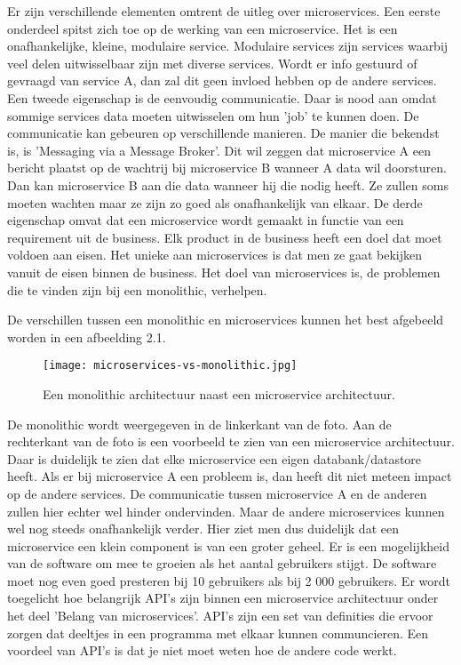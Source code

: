 Er zijn verschillende elementen omtrent de uitleg over microservices. Een eerste onderdeel spitst zich toe op de  werking van een microservice. Het is een onafhankelijke, kleine, modulaire service. Modulaire services zijn services waarbij veel delen uitwisselbaar zijn met diverse services. Wordt er info gestuurd of gevraagd van service A, dan zal dit geen invloed hebben op de andere services. Een tweede eigenschap is de eenvoudig communicatie. Daar is nood aan omdat sommige services data moeten uitwisselen om hun 'job' te kunnen doen. De communicatie kan gebeuren op verschillende manieren. De manier die bekendst is, is 'Messaging via a Message Broker'. Dit wil zeggen dat microservice A een bericht plaatst op de wachtrij bij microservice B wanneer A data wil doorsturen. Dan kan microservice B aan die data wanneer hij die nodig heeft. Ze zullen soms moeten wachten maar ze zijn zo goed als onafhankelijk van elkaar. De derde eigenschap omvat dat een microservice wordt gemaakt in functie van een requirement uit de business. Elk product in de business heeft een doel dat moet voldoen aan eisen. Het unieke aan microservices is dat  men  ze gaat bekijken vanuit de eisen binnen de business. Het doel van microservices is, de problemen die te vinden zijn bij een monolithic, verhelpen. 
 
De verschillen tussen een monolithic en microservices kunnen het best afgebeeld worden in een afbeelding 2.1.

\begin{figure}[h!]
	\texttt{[image: microservices-vs-monolithic.jpg]}
	\centering
	\caption{Een monolithic architectuur naast een microservice architectuur. \textcite{Watts2018}}
\end{figure}
 De monolithic wordt  weergegeven in de linkerkant van de foto. Aan de rechterkant van de foto is een voorbeeld te zien van een microservice architectuur. Daar is duidelijk te zien dat elke microservice een eigen databank/datastore heeft. 
 Als er bij microservice A een probleem is, dan heeft dit niet meteen impact op de andere services. De communicatie tussen microservice A en de anderen zullen hier echter wel hinder ondervinden. Maar de andere microservices kunnen wel nog steeds onafhankelijk verder. 
 Hier ziet men dus duidelijk dat een microservice een klein component is van een groter geheel.
 Er is een mogelijkheid van de software om mee te groeien als het aantal gebruikers stijgt. De software moet nog even goed presteren bij 10 gebruikers als bij 2 000 gebruikers. Er wordt toegelicht hoe belangrijk API's zijn binnen een microservice architectuur onder het deel 'Belang van microservices'. API's zijn een set van definities die ervoor zorgen dat deeltjes in een programma met elkaar kunnen communcieren. Een voordeel van API's is dat je niet moet  weten hoe de andere code werkt.

